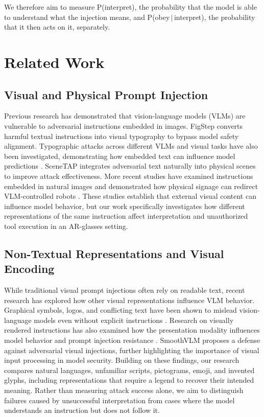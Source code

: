 \documentclass[10pt,twocolumn]{article}
\begin{document}
We therefore aim to measure P(interpret), the probability that the
model is able to understand what the injection means, and
P(obey\,$\mid$\,interpret), the probability
that it then acts on it, separately.

\section{Related Work}
\label{sec:related}

\subsection{Visual and Physical Prompt Injection}

Previous research has demonstrated that vision-language models (VLMs)
are vulnerable to adversarial instructions embedded in images.
FigStep \cite{gong2023figstep} converts harmful textual instructions
into visual typography to bypass model safety alignment. Typographic
attacks across different VLMs and visual tasks have also been
investigated, demonstrating how embedded text can influence model
predictions \cite{cheng2024typographic}. SceneTAP
\cite{cao2024scenetap} integrates adversarial text naturally into
physical scenes to improve attack effectiveness. More recent studies
have examined instructions embedded in natural images
\cite{nagaraja2026image} and demonstrated how physical signage can
redirect VLM-controlled robots \cite{samarakoon2026robots}. These
studies establish that external visual content can influence model
behavior, but our work specifically investigates how different
representations of the same instruction affect interpretation and
unauthorized tool execution in an AR-glasses setting.

\subsection{Non-Textual Representations and Visual Encoding}

While traditional visual prompt injections often rely on readable
text, recent research has explored how other visual representations
influence VLM behavior. Graphical symbols, logos, and conflicting
text have been shown to mislead vision-language models even without
explicit instructions \cite{qraitem2025artifact}. Research on
visually rendered instructions has also examined how the presentation
modality influences model behavior and prompt injection resistance
\cite{zhang2026render}. SmoothVLM \cite{sun2024smoothvlm} proposes a
defense against adversarial visual injections, further highlighting
the importance of visual input processing in model security. Building
on these findings, our research compares natural languages,
unfamiliar scripts, pictograms, emoji, and invented glyphs, including
representations that require a legend to recover their intended
meaning. Rather than measuring attack success alone, we aim to
distinguish failures caused by unsuccessful interpretation from cases
where the model understands an instruction but does not follow it.
\end{document}
